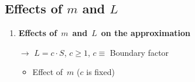 \documentclass[8pt]{beamer} %
\begin{document}
\subsection*{Effects of $m$ and $L$}
\begin{frame}

\begin{enumerate}
\item<1-> \textbf{Effects of}\, $m$\, \textbf{and}\, $L$\, \textbf{on the approximation}

\vspace{3mm}
 \;\;  $\to$\;\;  $L=c \cdot S$, \hspace{3mm} $c \geqslant 1$, \hspace{1mm} $c \equiv$ {\color{navyblue} Boundary factor}

\vspace{3mm}
\begin{itemize}\setlength\itemsep{1mm}
\item<2-> \normalsize Effect of\, $m$\; ($c$ is fixed)


\end{itemize}
\end{enumerate}
\end{frame}
\end{document}
